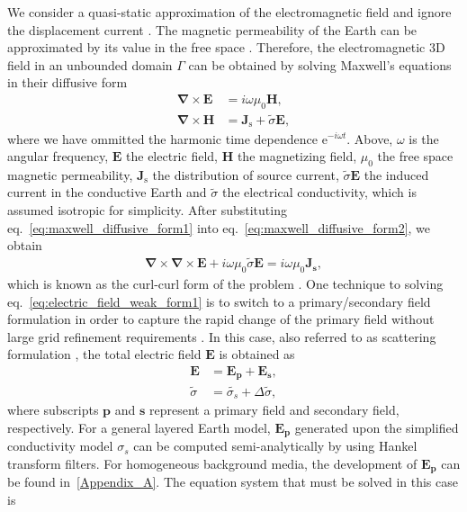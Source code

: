 \documentclass[review]{elsarticle}
\begin{document}
We consider a quasi-static approximation of the electromagnetic field and ignore the displacement current \citep{Zhdanov2009}. The magnetic permeability of the Earth can be approximated by its value in the free space \citep{Cai2017}. Therefore, the electromagnetic 3D field in an unbounded domain $\Gamma$ can be obtained by solving Maxwell's equations in their diffusive form \citep{Zhdanov2009}
\begin{align}
	\boldsymbol{\nabla} \times \mathbf{E} &= i\omega \mu_{0}\mathbf{H}, \label{eq:maxwell_diffusive_form1} \\
	\boldsymbol{\nabla} \times \mathbf{H} &= \mathbf{J}_{\text{s}} + \tilde{\sigma}\mathbf{E}, \label{eq:maxwell_diffusive_form2}
\end{align}
where we have ommitted the harmonic time dependence e$^{-i \omega t}$. Above, $\omega$ is the angular frequency, $\mathbf E$ the electric field, $\mathbf H$ the magnetizing field, $\mu_{0}$ the free space magnetic permeability, $\mathbf J_{\text{s}}$ the distribution of source current, $\tilde{\sigma}\mathbf E$ the induced current in the conductive Earth and $\tilde{\sigma}$ the electrical conductivity, which is assumed isotropic for simplicity. After substituting eq.~\eqref{eq:maxwell_diffusive_form1} into eq.~\eqref{eq:maxwell_diffusive_form2}, we obtain
\begin{align}
\boldsymbol{\nabla} \times \boldsymbol{\nabla} \times \mathbf{E} + i \omega \mu_{0} \tilde{\sigma} \mathbf{E} = i \omega \mu_{0} \mathbf{J_{\text{s}}},
\label{eq:electric_field_weak_form1}
\end{align}
which is known as the curl-curl form of the problem \citep{Newman2002}. One technique to solving eq.~\eqref{eq:electric_field_weak_form1} is to switch to a primary/secondary field formulation in order to capture the rapid change of the primary field without large grid refinement requirements \citep{Cai2014}. In this case, also referred to as scattering formulation \citep{Zhdanov2009,Cai2014}, the total electric field $\mathbf E$ is obtained as
\begin{align}
\mathbf E &= \mathbf{E_{p}} + \mathbf{E_{s}}, \\
\tilde{\sigma} &=  \tilde{\sigma_{s}} + \Delta \tilde{\sigma},
\label{eq:total_electric_field}
\end{align}
where subscripts $\mathbf{p}$ and $\mathbf{s}$ represent a primary field and secondary field, respectively. For a general layered Earth model, $\mathbf{E_{p}}$ generated upon the simplified conductivity model $\sigma_s$ can be computed semi-analytically by using Hankel transform filters. For homogeneous background media, the development of $\mathbf{E_{p}}$ can be found in~\ref{Appendix_A}. The equation system that must be solved in this case is
\end{document}
